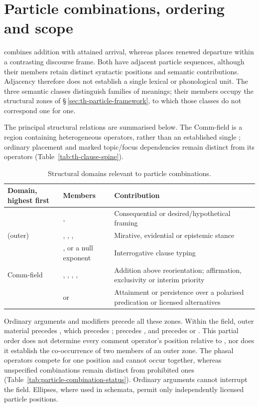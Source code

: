 \section{Particle combinations, ordering and scope}
\label{sec:particle-combinations}

 combines addition with attained arrival, whereas
 places renewed departure within a contrasting
discourse frame. Both have adjacent particle sequences, although their
members retain distinct syntactic positions and semantic contributions.
Adjacency therefore does not establish a single lexical or phonological unit.
The three semantic classes distinguish families of meanings; their members
occupy the structural zones of §\,\ref{sec:th-particle-framework}, to which
those classes do not correspond one for one.

The principal structural relations are summarised below. The Comm-field is
a region containing heterogeneous operators, rather than an established
single ; ordinary placement and marked topic/focus
dependencies remain distinct from its operators
(Table~\ref{tab:th-clause-spine}).

\begin{table}[ht]
\footnotesize
\caption{Structural domains relevant to particle combinations.}
\label{tab:particle-combination-domains}
\begin{tabularx}{\textwidth}{l L L}
\toprule
Domain, highest first & Members & Contribution \\
\midrule
{} & ,  &
Consequential or desired/hypothetical framing \\
 (outer) & , , ,  &
Mirative, evidential or epistemic stance \\
 & , or a null exponent & Interrogative clause typing \\
Comm-field & , , , ,  &
Addition above reorientation; affirmation, exclusivity or interim priority \\
 &  or  &
Attainment or persistence over a polarised predication or licensed alternatives \\
\bottomrule
\end{tabularx}
\end{table}

Ordinary arguments and modifiers precede all these zones. Within the
field, outer material precedes , which precedes ;
 precedes , and  precedes  or
. This partial order does not determine every comment operator's
position relative to , nor does it establish the co-occurrence of
two members of an outer zone. The phasal operators compete for one position
and cannot occur together, whereas unspecified combinations remain distinct
from prohibited ones (Table~\ref{tab:particle-combination-status}). Ordinary
arguments cannot interrupt the field. Ellipses, where used in schemata,
permit only independently licensed particle positions.

